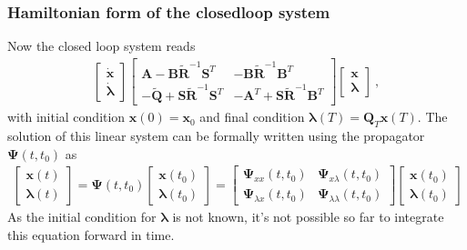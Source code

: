 \documentclass[letterpaper,10pt,english]{jupyterBook}
\begin{document}
\subsubsection{Hamiltonian form of the closed\sphinxhyphen{}loop system}
\label{\detokenize{ch/control/optimal-control-full-state-linear:hamiltonian-form-of-the-closed-loop-system}}\label{\detokenize{ch/control/optimal-control-full-state-linear:control-optimal-full-state-fb-linear-hamiltonian-system}}
\sphinxAtStartPar
Now the closed loop system reads
\begin{equation}\label{equation:ch/control/optimal-control-full-state-linear:eq:optimal:linear:cl:hamiltonian}
\begin{split}
\begin{bmatrix} \dot{\mathbf{x}} \\ \dot{\boldsymbol\lambda} \end{bmatrix}
\begin{bmatrix}
  \mathbf{A} - \mathbf{B} \widetilde{\mathbf{R}}^{-1} \mathbf{S}^T & - \mathbf{B} \widetilde{\mathbf{R}}^{-1} \mathbf{B}^T \\
  -\widetilde{\mathbf{Q}} + \mathbf{S} \widetilde{\mathbf{R}}^{-1} \mathbf{S}^T & - \mathbf{A}^T + \mathbf{S} \widetilde{\mathbf{R}}^{-1} \mathbf{B}^T
\end{bmatrix}
\begin{bmatrix}      \mathbf{x}  \\      \boldsymbol\lambda  \end{bmatrix} \ ,
\end{split}
\end{equation}
\sphinxAtStartPar
with initial condition \(\mathbf{x}(0) = \mathbf{x}_0\) and final condition \(\boldsymbol\lambda(T) = \mathbf{Q}_T \mathbf{x}(T)\). The solution of this linear system can be formally written using the propagator \(\boldsymbol\Psi(t,t_0)\) as
\begin{equation*}
\begin{split}\begin{bmatrix} \mathbf{x}(t) \\ \boldsymbol\lambda(t)  \end{bmatrix} = \boldsymbol\Psi(t,t_0) \begin{bmatrix} \mathbf{x}(t_0) \\ \boldsymbol\lambda(t_0) \end{bmatrix} = \begin{bmatrix} \boldsymbol\Psi_{xx}(t,t_0) & \boldsymbol\Psi_{x\lambda}(t,t_0) \\ \boldsymbol\Psi_{\lambda x}(t,t_0) & \boldsymbol\Psi_{\lambda \lambda}(t,t_0) \end{bmatrix} \begin{bmatrix} \mathbf{x}(t_0) \\ \boldsymbol\lambda(t_0) \end{bmatrix}\end{split}
\end{equation*}
\sphinxAtStartPar
As the initial condition for \(\boldsymbol\lambda\) is not known, it’s not possible so far to integrate this equation forward in time.
\end{document}

